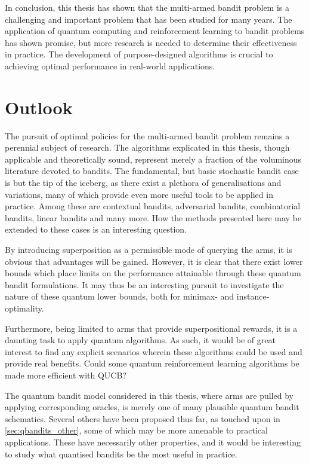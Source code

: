 In conclusion, this thesis has shown that the multi-armed bandit problem is a challenging and important problem that has been studied for many years.
The application of quantum computing and reinforcement learning to bandit problems has shown promise, but more research is needed to determine their effectiveness in practice.
The development of purpose-designed algorithms is crucial to achieving optimal performance in real-world applications.

\section{Outlook}
The pursuit of optimal policies for the multi-armed bandit problem remains a perennial subject of research.
The algorithms explicated in this thesis, though applicable and theoretically sound, represent merely a fraction of the voluminous literature devoted to bandits.
The fundamental, but basic stochastic bandit case is but the tip of the iceberg, as there exist a plethora of generalisations and variations, many of which provide even more useful tools to be applied in practice.
Among these are contextual bandits, adversarial bandits, combinatorial bandits, linear bandits and many more.
How the methods presented here may be extended to these cases is an interesting question.

By introducing superposition as a permissible mode of querying the arms, it is obvious that advantages will be gained.
However, it is clear that there exist lower bounds which place limits on the performance attainable through these quantum bandit formulations.
It may thus be an interesting pursuit to investigate the nature of these quantum lower bounds, both for minimax- and instance-optimality.

Furthermore, being limited to arms that provide superpositional rewards, it is a daunting task to apply quantum algorithms.
As such, it would be of great interest to find any explicit scenarios wherein these algorithms could be used and provide real benefits.
Could some quantum reinforcement learning algorithms be made more efficient with QUCB?

The quantum bandit model considered in this thesis, where arms are pulled by applying corresponding oracles, is merely one of many plausible quantum bandit schematics.
Several others have been proposed thus far, as touched upon in \cref{sec:qbandits_other}, some of which may be more amenable to practical applications.
These have necessarily other properties, and it would be interesting to study what quantised bandits be the most useful in practice.


